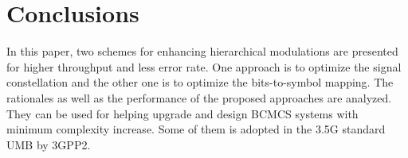 \documentclass[conference]{IEEEtran}
\begin{document}
\section{Conclusions}
In this paper, two schemes for enhancing hierarchical modulations
are presented for higher throughput and less error rate. One
approach is to optimize the signal constellation and the other one
is to optimize the bits-to-symbol mapping. The rationales as well
as the performance of the proposed approaches are analyzed. They
can be used for helping upgrade and design BCMCS systems with
minimum complexity increase. Some of them is adopted in the 3.5G
standard UMB by 3GPP2. \small


\end{document}
